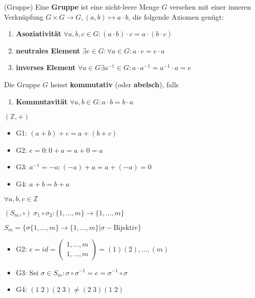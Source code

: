 \documentclass[../Algebra_script.tex]{subfiles}
\begin{document}
\begin{definition}{(Gruppe)}
	Eine \textbf{Gruppe} ist eine nicht-leere Menge $G$ versehen mit einer inneren Verknüpfung $G \times G \to G, (a, b) \mapsto a \cdot b$, die folgende Axiomen genügt:
	\begin{enumerate}
		\item{\textbf{Asoziativität}} $\forall a, b, c \in G: (a \cdot b) \cdot c = a \cdot (b \cdot c)$
		\item{\textbf{neutrales Element}} $\exists e \in G : \forall a \in G : a \cdot e = e \cdot a$
		\item{\textbf{inverses Element}} $\forall a \in G \exists a^{-1} \in G : a \cdot a^{-1} = a^{-1} \cdot a = e$
	\end{enumerate}
	Die Gruppe $G$ heisst \textbf{kommutativ} (oder \textbf{abelsch}), falls
	\begin{enumerate}[resume]
		\item{\textbf{Kommutavität}} $\forall a, b \in G : a \cdot b = b \cdot a$
	\end{enumerate} 
\end{definition}

\begin{example}{$(\mathbb{Z}, +)$}
	\begin{itemize}
		\item{G1:} $(a + b) + c = a + (b + c)$
		\item{G2:} $e = 0 : 0 + a = a + 0 = a$
		\item{G3:} $a^{-1} = -a: (-a) + a = a + (-a) = 0$
		\item{G4:} $a + b = b + a$
	\end{itemize}
	$\forall a, b, c \in \mathbb{Z}$
\end{example}
\begin{example}{$(S_m, \circ)\; \sigma_1 \circ \sigma_2: \{1, \ldots, m\} \to \{1, \ldots, m\}$}

	$S_m = \big\{ \sigma \{1, \ldots, m\} \to \{1, \ldots, m\}| \sigma - \text{Bijektiv}\big\}$
	\begin{itemize}
		\item{G2:} $e = id = \left(
			\begin{array}{c}
				1, \ldots, m\\
				1, \ldots, m
			\end{array}
			\right) = (1)(2), \ldots, (m)$
		\item{G3:} Sei $\sigma \in S_m: \sigma \circ \sigma^{-1} = e = \sigma^{-1}\circ \sigma$
		\item{G4:} $(1\; 2)(2\; 3) \neq (2\; 3)(1\; 2)$
	\end{itemize}
\end{example}
\end{document}
